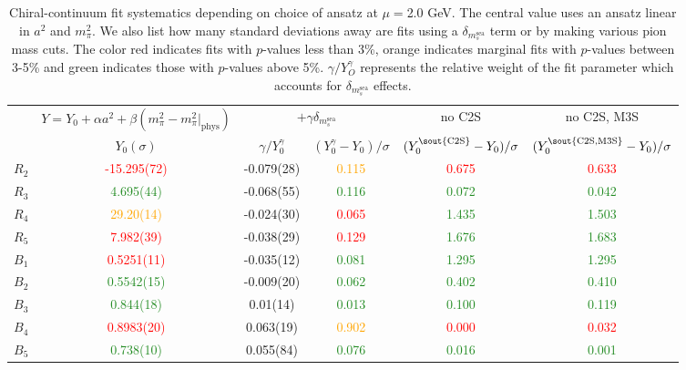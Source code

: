\begin{table}
\caption{\label{tab:fit_systematics} Chiral-continuum fit systematics depending on choice of ansatz at $\mu=$2.0 GeV. The central value uses an ansatz linear in $a^2$ and $m_\pi^2$. We also list how many standard deviations away are fits using a $\delta_{m_s^\text{sea}}$ term or by making various pion mass cuts. The color red indicates fits with $p$-values less than 3\%, orange indicates marginal fits with $p$-values between 3-5\% and green indicates those with $p$-values above 5\%. $\gamma/Y_O^\gamma$ represents the relative weight of the fit parameter  which accounts for $\delta_{m_s^\text{sea}}$ effects.}
\begin{tabular}{c|c|c|c|c|c}
\hline
\hline
 & $Y=Y_0+\alpha a^2 +\beta (m_\pi^2-m_\pi^2|_\text{phys})$ & \multicolumn{2}{c|}{$+\gamma\delta_{m_s^{\text{sea}}}$} & no C2S & no C2S, M3S \\
 & $Y_0(\sigma)$ & $\gamma/Y_0^\gamma$ & $(Y_0^\gamma-Y_0)/\sigma$ & $(Y_0^\text{\sout{C2S}}-Y_0)/\sigma$ & $(Y_0^\text{\sout{C2S,M3S}}-Y_0)/\sigma$ \\
\hline
$R_2$ & \textcolor{red}{-15.295(72)} & -0.079(28) & \textcolor{orange}{0.115} & \textcolor{red}{0.675} & \textcolor{red}{0.633}\\
$R_3$ & \textcolor{ForestGreen}{4.695(44)} & -0.068(55) & \textcolor{ForestGreen}{0.116} & \textcolor{ForestGreen}{0.072} & \textcolor{ForestGreen}{0.042}\\
$R_4$ & \textcolor{orange}{29.20(14)} & -0.024(30) & \textcolor{red}{0.065} & \textcolor{ForestGreen}{1.435} & \textcolor{ForestGreen}{1.503}\\
$R_5$ & \textcolor{red}{7.982(39)} & -0.038(29) & \textcolor{red}{0.129} & \textcolor{ForestGreen}{1.676} & \textcolor{ForestGreen}{1.683}\\
\hline
$B_1$ & \textcolor{red}{0.5251(11)} & -0.035(12) & \textcolor{ForestGreen}{0.081} & \textcolor{ForestGreen}{1.295} & \textcolor{ForestGreen}{1.295}\\
$B_2$ & \textcolor{ForestGreen}{0.5542(15)} & -0.009(20) & \textcolor{ForestGreen}{0.062} & \textcolor{ForestGreen}{0.402} & \textcolor{ForestGreen}{0.410}\\
$B_3$ & \textcolor{ForestGreen}{0.844(18)} & 0.01(14) & \textcolor{ForestGreen}{0.013} & \textcolor{ForestGreen}{0.100} & \textcolor{ForestGreen}{0.119}\\
$B_4$ & \textcolor{red}{0.8983(20)} & 0.063(19) & \textcolor{orange}{0.902} & \textcolor{red}{0.000} & \textcolor{red}{0.032}\\
$B_5$ & \textcolor{ForestGreen}{0.738(10)} & 0.055(84) & \textcolor{ForestGreen}{0.076} & \textcolor{ForestGreen}{0.016} & \textcolor{ForestGreen}{0.001}\\
\hline
\hline
\end{tabular}
\end{table}